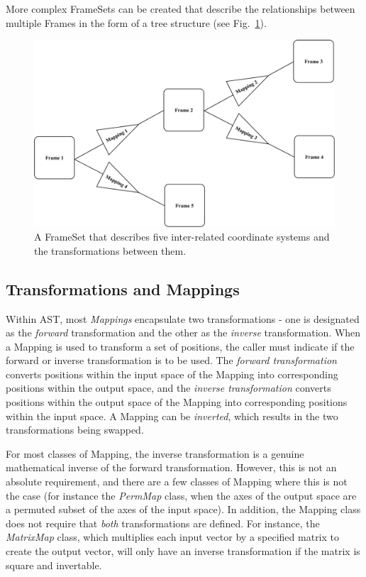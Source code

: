 \documentclass[final,authoryear,5p,times,twocolumn]{elsarticle}
\begin{document}
More complex FrameSets can be created that describe the relationships between
multiple Frames in the form of a tree structure (see
Fig.~\ref{fig:complex-frameset}).

\begin{figure}[h]
\centering
\includegraphics[width=\columnwidth]{complex-frameset}
\caption{A FrameSet that describes five inter-related coordinate systems
and the transformations between them. }
\label{fig:complex-frameset}
\end{figure}

\subsection{Transformations and Mappings}
\label{sec:mappings}
Within AST, most \emph{Mappings} encapsulate two transformations - one is
designated as the \emph{forward} transformation and the other as the
\emph{inverse} transformation. When a Mapping is used to transform a set
of positions, the caller must indicate if the forward or inverse
transformation is to be used. The \emph{forward transformation} converts
positions within the input space of the Mapping into corresponding
positions within the output space, and the \emph{inverse transformation}
converts positions within the output space of the Mapping into corresponding
positions within the input space. A Mapping can be \emph{inverted}, which
results in the two transformations being swapped.

For most classes of Mapping, the inverse transformation is a genuine
mathematical inverse of the forward transformation. However, this is not
an absolute requirement, and there are a few classes of Mapping where
this is not the case (for instance the \emph{PermMap} class, when the
axes of the output space are a permuted subset of the axes of the input
space). In addition, the Mapping class does not require that \emph{both}
transformations are defined. For instance, the \emph{MatrixMap} class, which
multiplies each input vector by a specified matrix to create the output
vector, will only have an inverse transformation if the matrix is square
and invertable.
\end{document}
